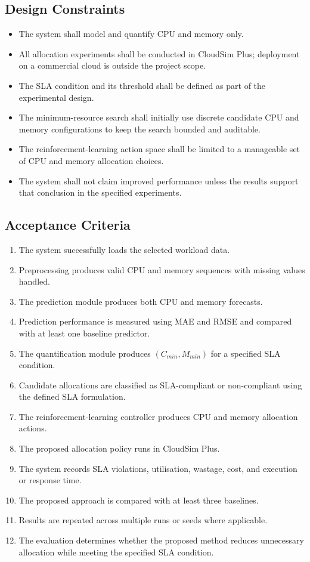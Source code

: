 \documentclass[12pt,a4paper]{report}
\begin{document}
\subsection{Design Constraints}
\begin{itemize}
    \item The system shall model and quantify CPU and memory only.
    \item All allocation experiments shall be conducted in CloudSim Plus; deployment on a commercial cloud is outside the project scope.
    \item The SLA condition and its threshold shall be defined as part of the experimental design.
    \item The minimum-resource search shall initially use discrete candidate CPU and memory configurations to keep the search bounded and auditable.
    \item The reinforcement-learning action space shall be limited to a manageable set of CPU and memory allocation choices.
    \item The system shall not claim improved performance unless the results support that conclusion in the specified experiments.
\end{itemize}
\lipsum[42-43]

\subsection{Acceptance Criteria}
\begin{enumerate}
    \item The system successfully loads the selected workload data.
    \item Preprocessing produces valid CPU and memory sequences with missing values handled.
    \item The prediction module produces both CPU and memory forecasts.
    \item Prediction performance is measured using MAE and RMSE and compared with at least one baseline predictor.
    \item The quantification module produces $(C_{min},M_{min})$ for a specified SLA condition.
    \item Candidate allocations are classified as SLA-compliant or non-compliant using the defined SLA formulation.
    \item The reinforcement-learning controller produces CPU and memory allocation actions.
    \item The proposed allocation policy runs in CloudSim Plus.
    \item The system records SLA violations, utilisation, wastage, cost, and execution or response time.
    \item The proposed approach is compared with at least three baselines.
    \item Results are repeated across multiple runs or seeds where applicable.
    \item The evaluation determines whether the proposed method reduces unnecessary allocation while meeting the specified SLA condition.
\end{enumerate}
\end{document}
